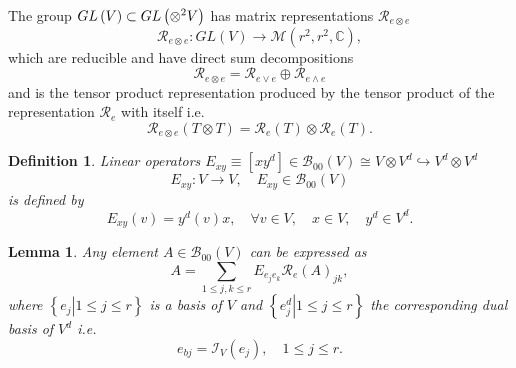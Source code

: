 \documentclass[aps,preprint]{revtex4}%
\newtheorem{definition}[theorem]{Definition}
\newtheorem{lemma}[theorem]{Lemma}
\begin{document}
The group $GL\left(  V\right)  \subset GL\left(  {\Large \otimes}^{2}V\right)
$ has matrix representations $\mathcal{R}_{e\otimes e}$%
\begin{equation}
\mathcal{R}_{e\otimes e}:GL\left(  V\right)  \rightarrow\mathcal{M}\left(
r^{2},r^{2},\mathbb{C}\right)  ,
\end{equation}
which are reducible and have direct sum decompositions
\begin{equation}
\mathcal{R}_{e\otimes e}=\mathcal{R}_{e\vee e}\oplus\mathcal{R}_{e\wedge e}%
\end{equation}
and is the tensor product representation produced by the tensor product of the
representation $\mathcal{R}_{e}$ with itself i.e.
\begin{equation}
\mathcal{R}_{e\otimes e}\left(  T\otimes T\right)  =\mathcal{R}_{e}\left(
T\right)  \otimes\mathcal{R}_{e}\left(  T\right)  .
\end{equation}


\begin{definition}
Linear operators $E_{xy}\equiv\left[  xy^{d}\right]  \in\mathcal{B}%
_{00}\left(  V\right)  \cong V\otimes V^{d}\hookrightarrow V^{d}\otimes
V^{d}$
\begin{equation}
E_{xy}:V\rightarrow V,\quad E_{xy}\in\mathcal{B}_{00}\left(  V\right)
\end{equation}
is defined by
\begin{equation}
E_{xy}\left(  v\right)  =y^{d}\left(  v\right)  x,\quad\forall v\in V,\quad
x\in V,\quad y^{d}\in V^{d}.
\end{equation}

\end{definition}

\begin{lemma}
Any element $A\in\mathcal{B}_{00}\left(  V\right)  $ can be expressed as
\begin{equation}
A=\sum_{1\leq j,k\leq r}E_{e_{j}e_{k}}\mathcal{R}_{e}\left(  A\right)  _{jk},
\end{equation}
where $\left\{  \left.  e_{j}\right\vert 1\leq j\leq r\right\}  $ is a basis
of $V$ and $\left\{  \left.  e_{j}^{d}\right\vert 1\leq j\leq r\right\}  $ the
corresponding dual basis of $V^{d}$ i.e.
\begin{equation}
e_{bj}=\mathcal{I}_{V}\left(  e_{j}\right)  ,\quad1\leq j\leq r.
\end{equation}

\end{lemma}
\end{document}
